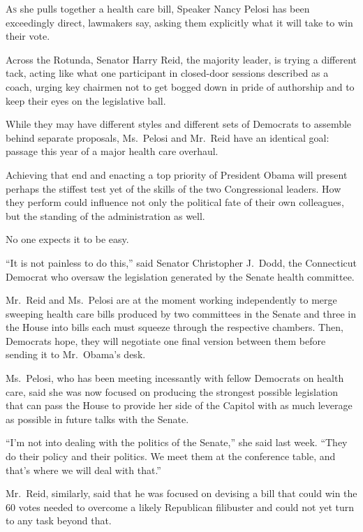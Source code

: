 ﻿\documentclass[12pt]{article}
\begin{document}
\lettrine{A}{s} she pulls together a health care bill, Speaker Nancy Pelosi
has been exceedingly direct, lawmakers say, asking them explicitly what it will take to win their
vote.

Across the Rotunda, Senator Harry Reid, the majority leader, is trying a different tack, acting like
what one participant in closed-door sessions described as a coach, urging key chairmen not to get
bogged down in pride of authorship and to keep their eyes on the legislative ball.

While they may have different styles and different sets of Democrats to assemble behind separate
proposals, Ms.~Pelosi and Mr.~Reid have an identical goal: passage this year of a major health care
overhaul.

Achieving that end and enacting a top priority of President Obama will present perhaps the stiffest
test yet of the skills of the two Congressional leaders. How they perform could influence not only
the political fate of their own colleagues, but the standing of the administration as well.

No one expects it to be easy.

``It is not painless to do this,'' said Senator Christopher J.~Dodd, the Connecticut Democrat who
oversaw the legislation generated by the Senate health committee.

Mr.~Reid and Ms.~Pelosi are at the moment working independently to merge sweeping health care bills
produced by two committees in the Senate and three in the House into bills each must squeeze through
the respective chambers. Then, Democrats hope, they will negotiate one final version between them
before sending it to Mr.~Obama's desk.

Ms.~Pelosi, who has been meeting incessantly with fellow Democrats on health care, said she was now
focused on producing the strongest possible legislation that can pass the House to provide her side
of the Capitol with as much leverage as possible in future talks with the Senate.

``I'm not into dealing with the politics of the Senate,'' she said last week. ``They do their policy
and their politics. We meet them at the conference table, and that's where we will deal with that.''

Mr.~Reid, similarly, said that he was focused on devising a bill that could win the 60 votes needed
to overcome a likely Republican filibuster\cite{filibuster} and could not yet turn to any task
beyond that.
\end{document}
